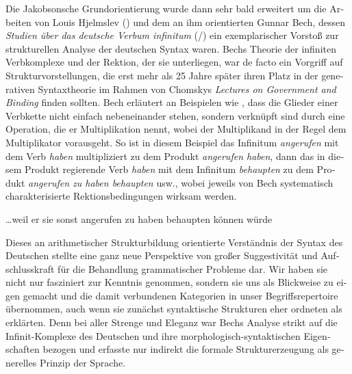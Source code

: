 \documentclass[output=paper,colorlinks,citecolor=brown]{langscibook}
\begin{document}
\begin{otherlanguage}{german}
\label{sec:1}

Die Jakobsonsche Grundorientierung wurde dann sehr bald erweitert um die Arbeiten von Louis Hjelmslev (\citeyear{Hjelmslev1943,Hjelmslev1961}) und dem an ihm orientierten Gunnar \mbox{Bech}, dessen \textit{Studien über das deutsche Verbum infinitum} (\citeyear{bi:Bech1955}/\citeyear{Bech1957}) ein exemplarischer Vorstoß zur strukturellen Analyse der deutschen Syntax waren. Bechs Theorie der infiniten Verbkomplexe und der Rektion, der sie unterliegen, war de facto ein Vorgriff auf Strukturvorstellungen, die erst mehr als 25 Jahre später ihren Platz in der generativen Syntaxtheorie im Rahmen von Chomskys \textit{Lectures on Government and Binding} \citep{bi:Chomsky1981} finden sollten. Bech erläutert an Beispielen wie , dass die Glieder einer Verbkette nicht einfach nebeneinander stehen, sondern verknüpft sind durch eine Operation, die er \glqq Multiplikation\grqq{} nennt, wobei der Multiplikand in der Regel dem Multiplikator vorausgeht. So ist in diesem Beispiel das Infinitum \textit{angerufen} mit dem Verb \textit{haben} multipliziert zu dem Produkt \textit{angerufen haben}, dann das in diesem Produkt regierende Verb \textit{haben} mit dem Infinitum \textit{behaupten} zu dem Produkt \textit{angerufen zu haben behaupten} usw., wobei jeweils von Bech systematisch charakterisierte Rektionsbedingungen wirksam werden.

\ea
\ldots weil er sie sonst angerufen zu haben behaupten können würde
\label{ex:1}
\z

\noindent Dieses an arithmetischer Strukturbildung orientierte Verständnis der Syntax des Deutschen stellte eine ganz neue Perspektive von großer Suggestivität und Aufschlusskraft für die Behandlung grammatischer Probleme dar. Wir haben sie nicht nur fasziniert zur Kenntnis genommen, sondern sie uns als Blickweise zu eigen gemacht und die damit verbundenen Kategorien in unser Begriffsrepertoire übernommen, auch wenn sie zunächst syntaktische Strukturen eher ordneten als erklärten. Denn bei aller Strenge und Eleganz war Bechs Analyse strikt auf die Infinit-Komplexe des Deutschen und ihre morphologisch-syntaktischen Eigenschaften bezogen und erfasste nur indirekt die formale Strukturerzeugung als generelles Prinzip der Sprache.


\end{otherlanguage}
\end{document}
